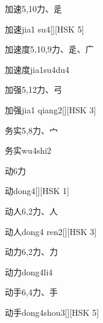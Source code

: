\begin{entry}{加速}{5,10}{⼒、⾡}
  \begin{phonetics}{加速}{jia1 su4}[][HSK 5]
  \end{phonetics}
\end{entry}

\begin{entry}{加速度}{5,10,9}{⼒、⾡、⼴}
  \begin{phonetics}{加速度}{jia1su4du4}
  \end{phonetics}
\end{entry}

\begin{entry}{加强}{5,12}{⼒、⼸}
  \begin{phonetics}{加强}{jia1 qiang2}[][HSK 3]
  \end{phonetics}
\end{entry}

\begin{entry}{务实}{5,8}{⼒、⼧}
  \begin{phonetics}{务实}{wu4shi2}
  \end{phonetics}
\end{entry}

\begin{entry}{动}{6}{⼒}
  \begin{phonetics}{动}{dong4}[][HSK 1]
  \end{phonetics}
\end{entry}

\begin{entry}{动人}{6,2}{⼒、⼈}
  \begin{phonetics}{动人}{dong4 ren2}[][HSK 3]
  \end{phonetics}
\end{entry}

\begin{entry}{动力}{6,2}{⼒、⼒}
  \begin{phonetics}{动力}{dong4li4}
  \end{phonetics}
\end{entry}

\begin{entry}{动手}{6,4}{⼒、⼿}
  \begin{phonetics}{动手}{dong4shou3}[][HSK 5]
  \end{phonetics}
\end{entry}

